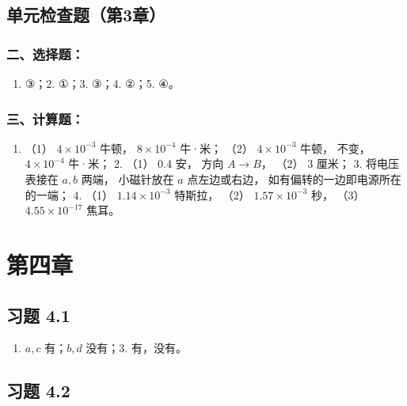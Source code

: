 \subsection{单元检查题（第3章）}\label{ux5355ux5143ux68c0ux67e5ux9898ux7b2c3ux7ae0-1}

\subsubsection{二、选择题：}\label{ux4e8cux9009ux62e9ux9898-1}

\begin{enumerate}
\def\labelenumi{\arabic{enumi}.}
\tightlist
\item
  ③；2. ①；3. ③；4. ②；5. ④。
\end{enumerate}

\subsubsection{三、计算题：}\label{ux4e09ux8ba1ux7b97ux9898-2}

\begin{enumerate}
\def\labelenumi{\arabic{enumi}.}
\tightlist
\item
  （1） \(4 \times 10^{-3}\) 牛顿， \(8 \times 10^{-4}\) 牛·米； （2）
  \(4 \times 10^{-3}\) 牛顿， 不变， \(4 \times 10^{-4}\) 牛·米； 2.
  （1） 0.4 安， 方向 \(A \to B\)， （2） 3 厘米； 3. 将电压表接在
  \(a, b\) 两端， 小磁针放在 \(a\) 点左边或右边，
  如有偏转的一边即电源所在的一端； 4. （1） \(1.14 \times 10^{-3}\)
  特斯拉， （2） \(1.57 \times 10^{-3}\) 秒， （3）
  \(4.55 \times 10^{-17}\) 焦耳。
\end{enumerate}

\section{第四章}\label{ux7b2cux56dbux7ae0}

\subsection{习题 4.1}\label{ux4e60ux9898-4.1-1}

\begin{enumerate}
\def\labelenumi{\arabic{enumi}.}
\setcounter{enumi}{1}
\tightlist
\item
  \(a, c\) 有；\(b, d\) 没有；3. 有，没有。
\end{enumerate}

\subsection{习题 4.2}\label{ux4e60ux9898-4.2-1}

